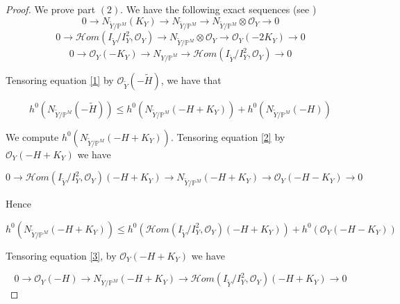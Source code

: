 \documentclass[11pt,twoside]{amsart}
\theoremstyle{plain}
\numberwithin{equation}{section}
\theoremstyle{definition}
\begin{document}
\begin{proof}
    We prove part $(2)$. We have the following exact sequences (see \cite[Lemma $4.1$]{GGP08})
\begin{equation}\label{1}
    0 \to N_{\widetilde{Y}/\mathbb{P}^M} (K_Y) \to N_{\widetilde{Y}/\mathbb{P}^M} \to N_{\widetilde{Y}/\mathbb{P}^M} \otimes \mathcal{O}_Y \to 0
\end{equation}
\begin{equation}\label{2}
    0 \to \mathcal{H}om(I_{\widetilde{Y}}/I_{Y}^2, \mathcal{O}_Y) \to N_{\widetilde{Y}/\mathbb{P}^M} \otimes \mathcal{O}_Y \to \mathcal{O}_Y(-2K_Y) \to 0 
\end{equation}
\begin{equation}\label{3}
    0 \to \mathcal{O}_Y(-K_Y) \to N_{Y/\mathbb{P}^M} \to \mathcal{H}om(I_{\widetilde{Y}}/I_{Y}^2, \mathcal{O}_Y) \to 0
\end{equation}


Tensoring equation \ref{1} by $\mathcal{O}_{\widetilde{Y}}(-\widetilde{H})$, we have that 

\begin{equation}\label{4}
 h^0(N_{\widetilde{Y}/\mathbb{P}^M}(-\widetilde{H})) \leq h^0(N_{\widetilde{Y}/\mathbb{P}^M}(-H+K_Y)) + h^0(N_{\widetilde{Y}/\mathbb{P}^M}(-H))
\end{equation}

We compute $h^0(N_{\widetilde{Y}/\mathbb{P}^M}(-H+K_Y))$. Tensoring equation \ref{2} by $\mathcal{O}_Y(-H+K_Y)$ we have 

\begin{equation*}
    0 \to \mathcal{H}om(I_{\widetilde{Y}}/I_{Y}^2, \mathcal{O}_Y)(-H+K_Y) \to N_{\widetilde{Y}/\mathbb{P}^M}(-H+K_Y) \to \mathcal{O}_Y(-H-K_Y) \to 0 
\end{equation*}

Hence 

\begin{equation}\label{6}
    h^0(N_{\widetilde{Y}/\mathbb{P}^M}(-H+K_Y)) \leq h^0(\mathcal{H}om(I_{\widetilde{Y}}/I_{Y}^2, \mathcal{O}_Y)(-H+K_Y)) + h^0(\mathcal{O}_Y(-H-K_Y))
\end{equation}

Tensoring equation \ref{3}, by $\mathcal{O}_Y(-H+K_Y)$ we have 

\begin{equation*}
    0 \to \mathcal{O}_Y(-H) \to N_{Y/\mathbb{P}^M}(-H+K_Y) \to \mathcal{H}om(I_{\widetilde{Y}}/I_{Y}^2, \mathcal{O}_Y)(-H+K_Y) \to 0
\end{equation*}


\end{proof}
\end{document}
